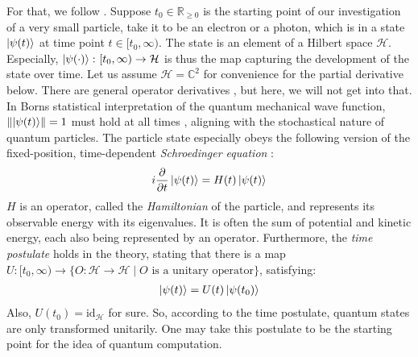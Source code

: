 \phantom{}

For that, we follow \cite[pp. 29-39]{Scherer2019}. Suppose \(t_0 \in \mathbb{R}_{\geq 0}\) is the starting point of our investigation of a very small particle, take it to be an electron or a photon, which is in a state \(\ket{\psi(t)}\) at time point \(t \in [t_0, \infty)\). The state is an element of a Hilbert space \(\mathcal{H}\). Especially, \(\ket{\psi(\cdot)}\colon [t_0, \infty) \to \mathcal{H}\) is thus the map capturing the development of the state over time. Let us assume \(\mathcal{H} = \mathbb{C}^2\) for convenience for the partial derivative below. There are general operator derivatives \cite[p. 126 ff.]{Werner2018}, but here, we will not get into that. In Borns statistical interpretation of the quantum mechanical wave function, \(\norm{\ket{\psi(t)}} = 1\) must hold at all times \cite[3-5]{Griffiths2018}, aligning with the stochastical nature of quantum particles. The particle state especially obeys the following version of the fixed-position, time-dependent \emph{Schroedinger equation} \cite[p. 38]{Scherer2019}:
\begin{align}
    i \frac{\partial}{\partial t} \ket{\psi(t)} = H(t) \ket{\psi(t)} \label{schroedinger_equation}
\end{align}
\(H\) is an operator, called the \emph{Hamiltonian} of the particle, and represents its observable energy with its eigenvalues. It is often the sum of potential and kinetic energy, each also being represented by an operator. Furthermore, the \emph{time postulate} \cite[p. 38]{Scherer2019} holds in the theory, stating that there is a map \(U\colon [t_0, \infty) \to \{O\colon \mathcal{H} \to \mathcal{H} \mid O \text{ is a unitary operator}\}\), satisfying:
\begin{align}
    \ket{\psi(t)} = U(t)\ket{\psi(t_0)} \label{time_postulate}
\end{align}
Also, \(U(t_0) = \text{id}_{\mathcal{H}}\) for sure. So, according to the time postulate, quantum states are only transformed unitarily. One may take this postulate to be the starting point for the idea of quantum computation.

\phantom{}

